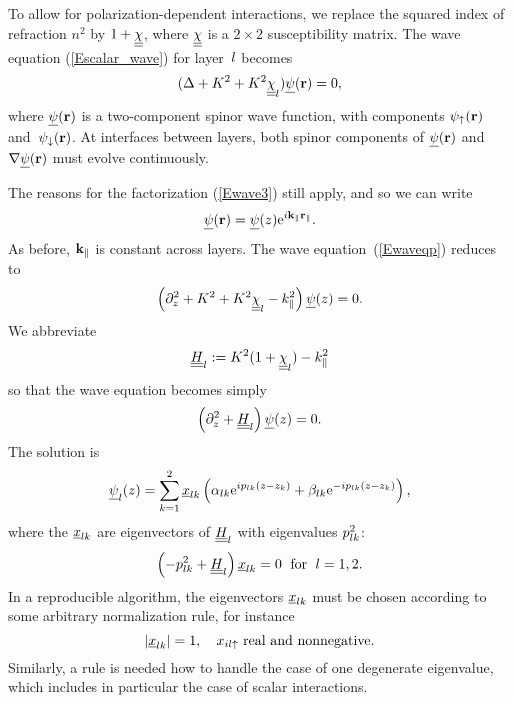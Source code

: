 To allow for polarization-dependent interactions,
we replace the squared index of refraction $n^2$
by $1+\underline{\underline{\chi}}$, where $\underline{\underline{\chi}}$ is a $2\times 2$ susceptibility matrix.
The wave equation (\ref{Escalar_wave}) for layer~$l$ becomes
\begin{equation}\label{Ewaveqp}  
(\Delta +K^2 +K^2 \underline{\underline{\chi}}_l) \underline{\psi}(\mathbf{r})= 0,
\end{equation}
where $\underline{\psi}(\mathbf{r})$ is a two-component spinor wave function,
with components $\psi_\uparrow(\mathbf{r})$ and~$\psi_\downarrow(\mathbf{r})$.
At interfaces between layers,
both spinor components of $\underline{\psi}(\mathbf{r})$ and $\mathbf{\nabla}\underline{\psi}(\mathbf{r})$
must evolve continuously.

The reasons for the factorization (\ref{Ewave3}) still apply,
and so we can write
\begin{equation}\label{Ewave3p}
\underline{\psi}(\mathbf{r}) = \underline{\psi}(z) \text{e}^{i \mathbf{k}_\parallel\mathbf{r}_\parallel}.
\end{equation}
As before, $\mathbf{k}_\parallel$ is constant across layers.
The wave equation~(\ref{Ewaveqp}) reduces to 
\begin{equation}\label{Ewavezp}
\left(\partial_z^2 + K^2 + K^2\underline{\underline{\chi}}_l - k_\parallel^2 \right) \underline{\psi}(z) = 0.
\end{equation}
We abbreviate
\begin{equation}
  \underline{\underline{H}}_l := K^2(1+\underline{\underline{\chi}}_l)-k_\parallel^2
\end{equation}
so that the wave equation becomes simply
\begin{equation}\label{Ewaveqp2}
  \left(\partial_z^2 + \underline{\underline{H}}_l\right) \underline{\psi}(z) = 0.
\end{equation}
The solution is
\begin{equation}\label{Epsizp}
  \underline{\psi}_l(z)
  = \sum_{k=1}^2 \underline{x}_{l k}\left(\alpha_{l k}\text{e}^{i p_{l k}(z-z_k)}
                            + \beta_{l k}\text{e}^{-i p_{l k}(z-z_k)}\right),
\end{equation}
where the $\underline{x}_{l k}$ are eigenvectors of $\underline{\underline{H}}_l$
with eigenvalues $p_{l k}^2$:
\begin{equation}
  \left( -p_{l k}^2 + \underline{\underline{H}}_l \right) \underline{x}_{l k} = 0
   \;\text{ for }\;l=1,2.
\end{equation}
In a reproducible algorithm,
the eigenvectors $\underline{x}_{l k}$ must be chosen according to some arbitrary
normalization rule,
for instance
\begin{equation}
  |\underline{x}_{l k}|=1,\quad x_{il\uparrow} \text{ real and nonnegative}.
\end{equation}
Similarly,
a rule is needed how to handle the case of one degenerate eigenvalue,
which includes in particular the case of scalar interactions.


